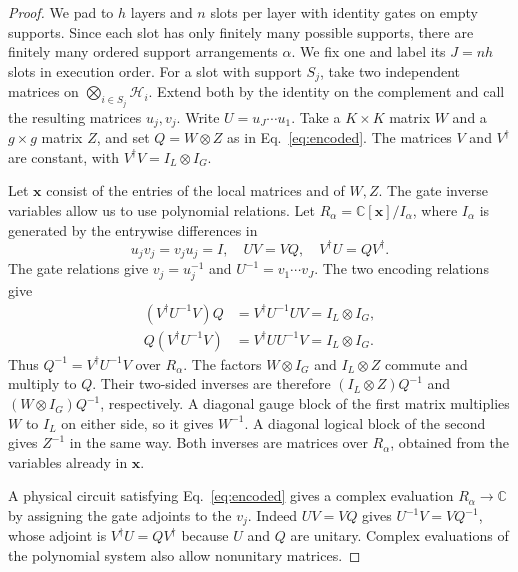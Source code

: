 \documentclass[aps,prl,reprint,notitlepage,nofootinbib,nobibnotes]{revtex4-2}
\newcommand{\HH}{\mathcal H}
\newcommand{\id}{I}
\begin{document}
\begin{proof}
We pad to \(h\) layers and \(n\) slots per layer
with identity gates on empty supports. Since each slot has only
finitely many possible supports, there are finitely many ordered
support arrangements \(\alpha\). We fix one and label its \(J=nh\) slots
in execution order. For a slot
with support \(S_j\), take two independent matrices on
\(\bigotimes_{i\in S_j}\HH_i\). Extend both by the identity on the
complement and call the resulting matrices \(u_j,v_j\). Write
\(U=u_J\cdots u_1\). Take a \(K\times K\) matrix \(W\) and a
\(g\times g\) matrix \(Z\), and set \(Q=W\otimes Z\) as in
Eq.~\eqref{eq:encoded}. The matrices \(V\) and \(V^\dagger\) are
constant, with \(V^\dagger V=\id_L\otimes\id_G\).

Let \(\mathbf x\) consist of the entries of the local matrices and
of \(W,Z\). The gate inverse variables allow us to use polynomial
relations. Let \(R_\alpha=\mathbb C[\mathbf x]/I_\alpha\), where
\(I_\alpha\) is generated by the entrywise differences in
\begin{equation}
 u_jv_j=v_ju_j=\id,\quad UV=VQ,\quad V^\dagger U=QV^\dagger.\label{eq:algebraic-encoding}
\end{equation}
The gate relations give \(v_j=u_j^{-1}\) and \(U^{-1}=v_1\cdots v_J\).
The two encoding relations give
\begin{align*}
 (V^\dagger U^{-1}V)Q
   &=V^\dagger U^{-1}UV=\id_L\otimes\id_G,\\
 Q(V^\dagger U^{-1}V)
   &=V^\dagger UU^{-1}V=\id_L\otimes\id_G.
\end{align*}
Thus \(Q^{-1}=V^\dagger U^{-1}V\) over \(R_\alpha\). The factors
\(W\otimes\id_G\) and \(\id_L\otimes Z\) commute and multiply to \(Q\).
Their two-sided inverses are therefore \((\id_L\otimes Z)Q^{-1}\)
and \((W\otimes\id_G)Q^{-1}\), respectively. A diagonal gauge block
of the first matrix multiplies \(W\) to \(\id_L\) on either side,
so it gives \(W^{-1}\). A diagonal logical block of the second
gives \(Z^{-1}\) in the same way. Both inverses are matrices over
\(R_\alpha\), obtained from the variables already in \(\mathbf x\).

A physical circuit satisfying Eq.~\eqref{eq:encoded} gives a complex
evaluation \(R_\alpha\to\mathbb C\) by assigning the gate adjoints
to the \(v_j\). Indeed \(UV=VQ\) gives \(U^{-1}V=VQ^{-1}\), whose
adjoint is \(V^\dagger U=QV^\dagger\) because \(U\) and \(Q\) are
unitary. Complex evaluations of the polynomial system also allow
nonunitary matrices.


\end{proof}
\end{document}

